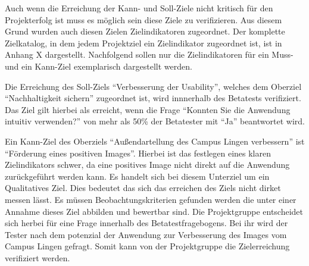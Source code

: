 Auch wenn die Erreichung der Kann- und Soll-Ziele nicht kritisch für den
Projekterfolg ist muss es möglich sein diese Ziele zu verifizieren. Aus diesem
Grund wurden auch diesen Zielen Zielindikatoren zugeordnet. Der komplette
Zielkatalog, in dem jedem Projektziel ein Zielindikator zugeordnet ist, ist in
Anhang X
dargestellt. Nachfolgend sollen nur die Zielindikatoren für ein Muss- und ein
Kann-Ziel exemplarisch dargestellt werden.


Die Erreichung des Soll-Ziels "`Verbesserung der Usability"', welches dem
Oberziel "`Nachhaltigkeit sichern"' zugeordnet ist, wird innnerhalb des
Betatests verifiziert. Das Ziel gilt hierbei als erreicht, wenn die Frage
"`Konnten Sie die Anwendung intuitiv verwenden?"' von mehr als 50\% der
Betatester mit "`Ja"' beantwortet wird.

Ein Kann-Ziel des Oberziels "`Außendartellung des Campus Lingen
verbessern"' ist "`Förderung eines positiven Images"'. Hierbei ist das festlegen
eines klaren Zielindikators schwer, da eine positives Image nicht direkt auf die
Anwendung zurückgeführt werden kann. Es handelt sich bei diesem Unterziel um ein
Qualitatives Ziel. %
Dies bedeutet das sich das erreichen des Ziels nicht dirket messen lässt. Es
müssen Beobachtungskriterien gefunden werden die unter einer Annahme dieses Ziel
abbilden und bewertbar sind. Die Projektgruppe entscheidet sich herbei für eine
Frage innerhalb des Betatestfragebogens. Bei ihr wird der Tester nach dem
potenzial der Anwendung zur Verbesserung des Images vom Campus Lingen gefragt.
Somit kann von der Projektgruppe die Zielerreichung verifiziert werden.











